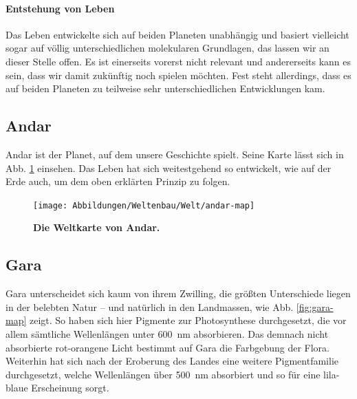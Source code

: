 \paragraph{Entstehung von Leben}
Das Leben entwickelte sich auf beiden Planeten unabhängig und basiert vielleicht sogar auf völlig unterschiedlichen molekularen Grundlagen, das lassen wir an dieser Stelle offen.
Es ist einerseits vorerst nicht relevant und andererseits kann es sein, dass wir damit zukünftig noch spielen möchten.
Fest steht allerdings, dass es auf beiden Planeten zu teilweise sehr unterschiedlichen Entwicklungen kam. 


\subsection{Andar} \label{sec:planet}
Andar ist der Planet, auf dem unsere Geschichte spielt.
Seine Karte lässt sich in Abb. \ref{fig:andar-map} einsehen.
Das Leben hat sich weitestgehend so entwickelt, wie auf der Erde auch, um dem oben erklärten Prinzip zu folgen.

\begin{figure}[tbh]
	\centering
	\texttt{[image: Abbildungen/Weltenbau/Welt/andar-map]}
	\caption[Weltkarte von Andar]{\textbf{Die Weltkarte von Andar.}}
	\label{fig:andar-map}
\end{figure}


\subsection{Gara} \label{sec:planet-zwilling}
Gara unterscheidet sich kaum von ihrem Zwilling, die größten Unterschiede liegen in der belebten Natur -- und natürlich in den Landmassen, wie Abb. \ref{fig:gara-map} zeigt.
So haben sich hier Pigmente zur Photosynthese durchgesetzt, die vor allem sämtliche Wellenlängen unter \SI{600}{\nano\meter} absorbieren.
Das demnach nicht absorbierte rot-orangene Licht bestimmt auf Gara die Farbgebung der Flora.
Weiterhin hat sich nach der Eroberung des Landes eine weitere Pigmentfamilie durchgesetzt, welche Wellenlängen über \SI{500}{\nano\meter} absorbiert und so für eine lila-blaue Erscheinung sorgt.

